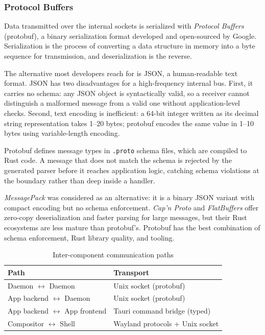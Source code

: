 \subsubsection{Protocol Buffers}
\label{sec:protobuf}

Data transmitted over the internal sockets is serialized with \emph{Protocol
Buffers} (protobuf), a binary serialization format developed and open-sourced by
Google. Serialization is the process of converting a data structure in memory
into a byte sequence for transmission, and deserialization is the reverse.

The alternative most developers reach for is JSON, a human-readable text format.
JSON has two disadvantages for a high-frequency internal bus. First, it carries
no schema: any JSON object is syntactically valid, so a receiver cannot
distinguish a malformed message from a valid one without application-level
checks. Second, text encoding is inefficient: a 64-bit integer written as its
decimal string representation takes 1--20 bytes; protobuf encodes the same value
in 1--10 bytes using variable-length encoding.

Protobuf defines message types in \texttt{.proto} schema files, which are
compiled to Rust code. A message that does not match the schema is rejected by
the generated parser before it reaches application logic, catching schema
violations at the boundary rather than deep inside a handler.

\emph{MessagePack} was considered as an alternative: it is a binary JSON
variant with compact encoding but no schema enforcement. \emph{Cap'n Proto} and
\emph{FlatBuffers} offer zero-copy deserialization and faster parsing for large
messages, but their Rust ecosystems are less mature than protobuf's. Protobuf
has the best combination of schema enforcement, Rust library quality, and
tooling.

\begin{table}[htbp]
\caption{Inter-component communication paths}
\label{tab:comms}
\begin{tabularx}{\linewidth}{lX}
\toprule
\textbf{Path} & \textbf{Transport} \\
\midrule
Daemon $\leftrightarrow$ Daemon            & Unix socket (protobuf) \\
App backend $\leftrightarrow$ Daemon       & Unix socket (protobuf) \\
App backend $\leftrightarrow$ App frontend & Tauri command bridge (typed) \\
Compositor $\leftrightarrow$ Shell         & Wayland protocols + Unix socket \\
\bottomrule
\end{tabularx}
\end{table}

